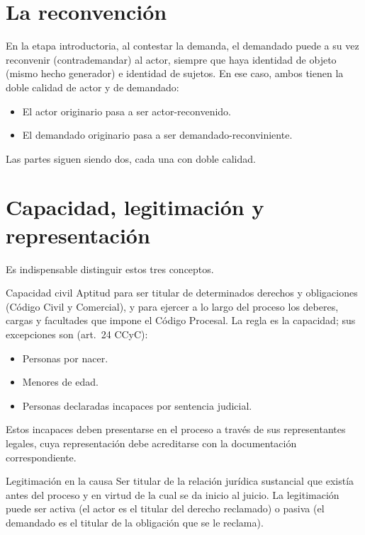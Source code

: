 \documentclass[12pt,oneside]{book}
\begin{document}
\section{La reconvención}

En la etapa introductoria, al contestar la demanda, el demandado puede a su vez reconvenir (contrademandar) al actor, siempre que haya identidad de objeto (mismo hecho generador) e identidad de sujetos. En ese caso, ambos tienen la doble calidad de actor y de demandado:

\begin{itemize}
    \item El actor originario pasa a ser actor-reconvenido.
    \item El demandado originario pasa a ser demandado-reconviniente.
\end{itemize}

Las partes siguen siendo dos, cada una con doble calidad.

\section{Capacidad, legitimación y representación}

Es indispensable distinguir estos tres conceptos.

\begin{definition}{Capacidad civil}
Aptitud para ser titular de determinados derechos y obligaciones (Código Civil y Comercial), y para ejercer a lo largo del proceso los deberes, cargas y facultades que impone el Código Procesal. La regla es la capacidad; sus excepciones son (art.\ 24 CCyC):
\begin{itemize}
    \item Personas por nacer.
    \item Menores de edad.
    \item Personas declaradas incapaces por sentencia judicial.
\end{itemize}
Estos incapaces deben presentarse en el proceso a través de sus representantes legales, cuya representación debe acreditarse con la documentación correspondiente.
\end{definition}

\begin{definition}{Legitimación en la causa}
Ser titular de la relación jurídica sustancial que existía antes del proceso y en virtud de la cual se da inicio al juicio. La legitimación puede ser activa (el actor es el titular del derecho reclamado) o pasiva (el demandado es el titular de la obligación que se le reclama).
\end{definition}
\end{document}
